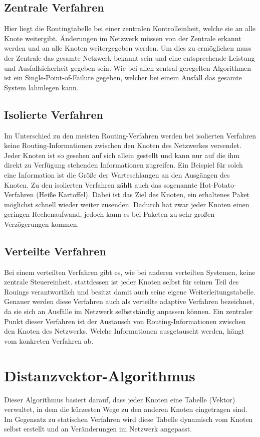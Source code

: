 \subsection{Zentrale Verfahren}
Hier liegt die Routingtabelle bei einer zentralen Kontrolleinheit, welche sie an alle Knote weitergibt. Änderungen im Netzwerk müssen von der Zentrale erkannt werden und an alle Knoten weitergegeben werden. Um dies zu ermöglichen muss der Zentrale das gesamte Netzwerk bekannt sein und eine entsprechende Leistung und Ausfallsicherheit gegeben sein. Wie bei allen zentral geregelten Algorithmen ist ein Single-Point-of-Failure gegeben, welcher bei einem Ausfall das gesamte System lahmlegen kann.

\subsection{Isolierte Verfahren}
Im Unterschied zu den meisten Routing-Verfahren werden bei isolierten Verfahren keine Routing-Informationen zwischen den Knoten des Netzwerkes versendet. Jeder Knoten ist so gesehen auf sich allein gestellt und kann nur auf die ihm direkt zu Verfügung stehenden Informationen zugreifen. Ein Beispiel für solch eine Information ist die Größe der Warteschlangen an den Ausgängen des Knoten. Zu den isolierten Verfahren zählt auch das sogenannte Hot-Potato-Verfahren (Heiße Kartoffel). Dabei ist das Ziel des Knoten, ein erhaltenes Paket möglichst schnell wieder weiter zusenden. Dadurch hat zwar jeder Knoten einen geringen Rechenaufwand, jedoch kann es bei Paketen zu sehr großen Verzögerungen kommen.

\subsection{Verteilte Verfahren}
Bei einem verteilten Verfahren gibt es, wie bei anderen verteilten Systemen, keine zentrale Steuereinheit. stattdessen ist jeder Knoten selbst für seinen Teil des Rouings verantwortlich und besitzt damit auch seine eigene Weiterleitungstabelle. Genauer werden diese Verfahren auch als verteilte adaptive Verfahren bezeichnet, da sie sich an Ausfälle im Netzwerk selbstständig anpassen können. Ein zentraler Punkt dieser Verfahren ist der Austausch von Routing-Informationen zwischen den Knoten des Netzwerks. Welche Informationen ausgetauscht werden, hängt vom konkreten Verfahren ab.

\section{Distanzvektor-Algorithmus}
Dieser Algorithmus basiert darauf, dass jeder Knoten eine Tabelle (Vektor) verwaltet, in dem die kürzesten Wege zu den anderen Knoten eingetragen sind. Im Gegensatz zu statischen Verfahren wird diese Tabelle dynamisch vom Knoten selbst erstellt und an Veränderungen im Netzwerk angepasst.

